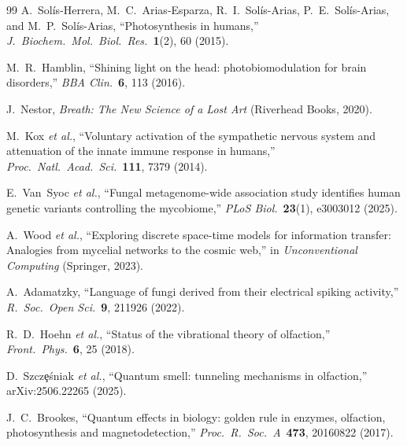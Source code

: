 \documentclass[11pt,twocolumn]{article}
\begin{document}
\begin{thebibliography}{99}
  A.~Sol\'is-Herrera, M.~C.~Arias-Esparza, R.~I.~Sol\'is-Arias,
  P.~E.~Sol\'is-Arias, and M.~P.~Sol\'is-Arias,
  ``Photosynthesis in humans,''
  \textit{J.\ Biochem.\ Mol.\ Biol.\ Res.}\ \textbf{1}(2), 60 (2015).

  M.~R.~Hamblin,
  ``Shining light on the head: photobiomodulation for brain disorders,''
  \textit{BBA Clin.}\ \textbf{6}, 113 (2016).

  J.~Nestor,
  \textit{Breath: The New Science of a Lost Art}
  (Riverhead Books, 2020).

  M.~Kox \textit{et al.},
  ``Voluntary activation of the sympathetic nervous system and
  attenuation of the innate immune response in humans,''
  \textit{Proc.\ Natl.\ Acad.\ Sci.}\ \textbf{111}, 7379 (2014).

  E.~Van~Syoc \textit{et al.},
  ``Fungal metagenome-wide association study identifies human genetic
  variants controlling the mycobiome,''
  \textit{PLoS Biol.}\ \textbf{23}(1), e3003012 (2025).

  A.~Wood \textit{et al.},
  ``Exploring discrete space-time models for information transfer:
  Analogies from mycelial networks to the cosmic web,''
  in \textit{Unconventional Computing} (Springer, 2023).

  A.~Adamatzky,
  ``Language of fungi derived from their electrical spiking activity,''
  \textit{R.\ Soc.\ Open Sci.}\ \textbf{9}, 211926 (2022).

  R.~D.~Hoehn \textit{et al.},
  ``Status of the vibrational theory of olfaction,''
  \textit{Front.\ Phys.}\ \textbf{6}, 25 (2018).

  D.~Szcz\c{e}\'sniak \textit{et al.},
  ``Quantum smell: tunneling mechanisms in olfaction,''
  arXiv:2506.22265 (2025).

  J.~C.~Brookes,
  ``Quantum effects in biology: golden rule in enzymes, olfaction,
  photosynthesis and magnetodetection,''
  \textit{Proc.\ R.\ Soc.\ A}\ \textbf{473}, 20160822 (2017).

\end{thebibliography}
\end{document}
